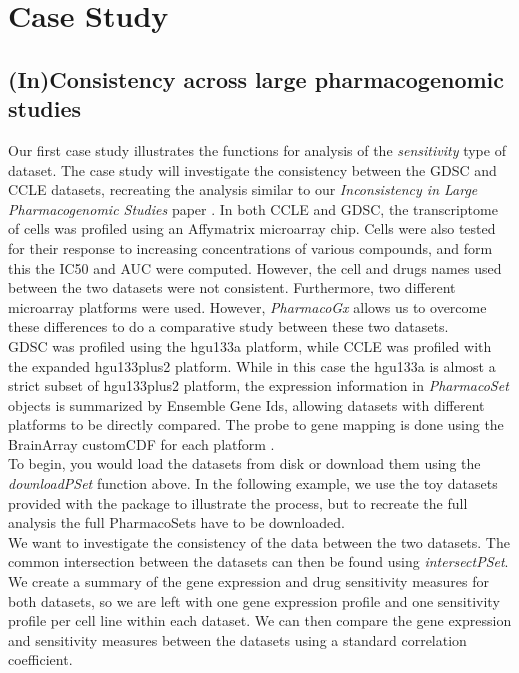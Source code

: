 \documentclass[11pt]{article}
\begin{document}
\section{Case Study}

\subsection{(In)Consistency across large pharmacogenomic studies}
Our first case study illustrates the functions for analysis of the \textit{sensitivity} type of dataset. The case study will investigate the consistency between the GDSC and CCLE datasets, recreating the analysis similar to our \textit{Inconsistency in Large Pharmacogenomic Studies} paper \cite{haibe-kains_inconsistency_2013}. In both CCLE and GDSC, the transcriptome of cells was profiled using an Affymatrix microarray chip. Cells were also tested for their response to increasing concentrations of various compounds, and form this the IC50 and AUC were computed. However, the cell and drugs names used between the two datasets were not consistent. Furthermore, two different microarray platforms were used. However, \textit{PharmacoGx} allows us to overcome these differences to do a comparative study between these two datasets. \\


GDSC was profiled using the hgu133a platform, while CCLE was profiled with the expanded hgu133plus2 platform. While in this case the hgu133a is almost a strict subset of hgu133plus2 platform, the expression information in \textit{PharmacoSet} objects is summarized by Ensemble Gene Ids, allowing datasets with different platforms to be directly compared. The probe to gene mapping is done using the BrainArray customCDF for each platform \cite{sabatti_thresholding_2002}.\\

To begin, you would load the datasets from disk or download them using the \textit{downloadPSet} function above. In the following example, we use the toy datasets provided with the package to illustrate the process, but to recreate the full analysis the full PharmacoSets have to be downloaded.\\

We want to investigate the consistency of the data between the two datasets. The common intersection between the datasets can then be found using \textit{intersectPSet}. We create a summary of the gene expression and drug sensitivity measures for both datasets, so we are left with one gene expression profile and one sensitivity profile per cell line within each dataset. We can then compare the gene expression and sensitivity measures between the datasets using a standard correlation coefficient. 
\end{document}
